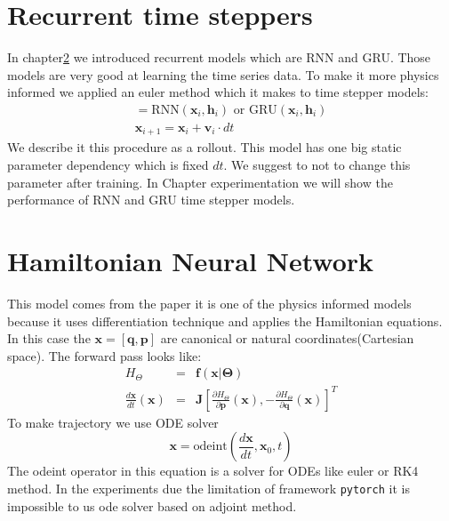 \section{Recurrent time steppers}
In chapter\ref{}  we introduced recurrent models which are RNN and GRU.
Those models are very good at learning the time series data. To make it more physics informed we applied an euler method which it makes to time stepper models:
\begin{eqnarray}
	[\mathbf{v}_i, \mathbf{h}_{i+1}] = \text{RNN}(\mathbf{x}_i,\mathbf{h}_i) \text{  or  }  \text{GRU}(\mathbf{x}_i,\mathbf{h}_i)\\
	\mathbf{x}_{i+1} = \mathbf{x}_i + \mathbf{v}_i \cdot dt
\end{eqnarray}
We describe it this procedure as a rollout. 
This model has one big static parameter dependency which is fixed $dt$. We suggest to not to change this parameter after training. In Chapter experimentation we will show the performance of RNN and GRU time stepper models.

\section{Hamiltonian Neural Network}
This model comes from the paper \cite{hnn} it is one of the physics informed models because it uses differentiation technique and applies the Hamiltonian equations. In this case the $\mathbf{x} = [\mathbf{q},\mathbf{p}]$ are canonical or natural coordinates(Cartesian space).
The forward pass looks like:
\begin{eqnarray}
	H_{\Theta} &=& \mathbf{f}(\mathbf{x}|\boldsymbol{\Theta})\\
	\frac{d\mathbf{x}}{dt}(\mathbf{x}) &=& \mathbf{J}\left[\frac{\partial H_{\Theta}}{\partial\mathbf{p}}(\mathbf{x}),-\frac{\partial H_{\Theta}}{\partial\mathbf{q}}(\mathbf{x})\right]^T
\end{eqnarray}
To make trajectory we use ODE solver
\begin{equation}
	\mathbf{x} = \text{odeint}\left(\frac{d\mathbf{x}}{dt},\mathbf{x}_0,t\right)
\end{equation} 
The odeint operator in this equation is a solver for ODEs like euler or RK4 method. In the experiments due the limitation of framework \texttt{pytorch} it is impossible to us ode solver based on adjoint method. \\
